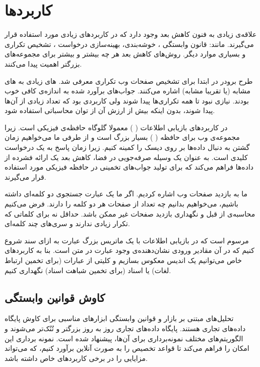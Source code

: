 \section{کاربردها}

علاقه‌ی زیادی به فنون کاهش بعد وجود دارد که در کاربردهای زیادی مورد استفاده قرار می‌گیرند. مانند: قانون وابستگی%
\cite{litez30, litez31}
، خوشه‌بندی، بهینه‌سازی درخواست%
\cite{litez136, litez44}
، تشخیص تکراری%
\cite{litez34, litez28}
و بسیاری موارد دیگر. روش‌های کاهش بعد هر چه بیشتر و بیشتر برای مجموعه‌های بزرگتر اهمیت پیدا می‌کنند.

طرح برودر%
\cite{litez34}
در ابتدا برای تشخیص صفحات وب تکراری معرفی شد. 
%
های زیادی به 
%
های مشابه (یا تقریبا مشابه) اشاره می‌کنند. جواب‌های برآورد شده به اندازه‌ی کافی خوب بودند. نیازی نبود تا همه تکراری‌ها پیدا شوند ولی کاربردی بود که تعداد زیادی از آن‌ها پیدا شوند، بدون اینکه بیش از ارزش آن از توان محاسباتی استفاده شود.

در کاربردهای بازیابی اطلاعات (%
%
)%
معمولا گلوگاه حافظه‌ی فیزیکی است. زیرا مجموعه‌ی وب برای حافظه (%
%
) بسیار بزرگ است و از طرفی ما می‌خواهیم زمان گشتن به دنبال داده‌ها بر روی دیسک را کمینه کنیم. زیرا زمان پاسخ به یک درخواست کلیدی است.
\cite{litez29}
 به عنوان یک وسیله صرفه‌جویی در فضا، کاهش بعد یک ارائه فشرده از داده‌ها فراهم می‌کند که برای تولید جواب‌های تخمینی در حافظه فیزیکی مورد استفاده قرار می‌گیرند.

ما به بازدید صفحات وب اشاره‌ کردیم. اگر ما یک عبارت جستجوی دو کلمه‌ای داشته باشیم، می‌خواهیم بدانیم چه تعداد از صفحات هر دو کلمه را دارند. فرض می‌کنیم محاسبه‌ی از قبل و نگهداری بازدید صفحات غیر ممکن باشد. حداقل نه برای کلماتی که تکرار زیادی ندارند و سری‌های چند کلمه‌ای.

مرسوم است که در بازیابی اطلاعات با یک ماتریس بزرگ عبارت به ازای سند شروع کنیم که در آن مقادیر ورودی نشان‌دهنده‌ی وجود عبارت در متن است. بنا به کاربردهای خاص می‌توانیم یک اندیس معکوس %
بسازیم و کلیتی از عبارات (برای تخمین ارتباط لغات) یا اسناد (برای تخمین شباهت اسناد) نگهداری کنیم.

\subsection{
کاوش قوانین وابستگی
}
تحلیل‌های مبتنی بر بازار و قوانین وابستگی 
\cite{litez8, litez9, litez10}
ابزارهای مناسبی برای کاوش پایگاه‌ داده‌های تجاری هستند. پایگاه داده‌های تجاری روز به روز بزرگتر و تُنُک‌تر می‌شوند
\cite{litez7, litez158}
و الگوریتم‌های مختلف نمونه‌برداری برای آن‌ها، پیشنهاد شده است. نمونه برداری این امکان را فراهم می‌کند تا قواعد تخصیص را به صورت آنلاین برآورد کنیم، که می‌تواند مزایایی را در برخی کاربردهای خاص داشته باشد.

